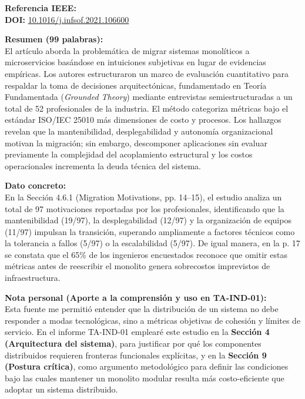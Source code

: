 \documentclass[11pt,a4paper]{article}
\begin{document}
\vspace{0.4cm}

\begin{tcolorbox}[colback=white,colframe=black!75!black,title=\textbf{Ficha Bibliográfica 3: Artículo Indexado (Information and Software Technology)}]
\textbf{Referencia IEEE:} \cite{ref3_towards_migration_framework} \\
\textbf{DOI:} \href{https://doi.org/10.1016/j.infsof.2021.106600}{10.1016/j.infsof.2021.106600}

\vspace{0.2cm}
\textbf{Resumen (99 palabras):} \\
El artículo aborda la problemática de migrar sistemas monolíticos a microservicios basándose en intuiciones subjetivas en lugar de evidencias empíricas. Los autores estructuraron un marco de evaluación cuantitativo para respaldar la toma de decisiones arquitectónicas, fundamentado en Teoría Fundamentada (\textit{Grounded Theory}) mediante entrevistas semiestructuradas a un total de 52 profesionales de la industria. El método categoriza métricas bajo el estándar ISO/IEC 25010 más dimensiones de costo y procesos. Los hallazgos revelan que la mantenibilidad, desplegabilidad y autonomía organizacional motivan la migración; sin embargo, descomponer aplicaciones sin evaluar previamente la complejidad del acoplamiento estructural y los costos operacionales incrementa la deuda técnica del sistema.

\vspace{0.2cm}
\textbf{Dato concreto:} \\
En la Sección 4.6.1 (Migration Motivations, pp. 14--15), el estudio analiza un total de 97 motivaciones reportadas por los profesionales, identificando que la mantenibilidad (19/97), la desplegabilidad (12/97) y la organización de equipos (11/97) impulsan la transición, superando ampliamente a factores técnicos como la tolerancia a fallos (5/97) o la escalabilidad (5/97). De igual manera, en la p. 17 se constata que el 65\% de los ingenieros encuestados reconoce que omitir estas métricas antes de reescribir el monolito genera sobrecostos imprevistos de infraestructura.

\vspace{0.2cm}
\textbf{Nota personal (Aporte a la comprensión y uso en TA-IND-01):} \\
Esta fuente me permitió entender que la distribución de un sistema no debe responder a modas tecnológicas, sino a métricas objetivas de cohesión y límites de servicio. En el informe TA-IND-01 emplearé este estudio en la \textbf{Sección 4 (Arquitectura del sistema)}, para justificar por qué los componentes distribuidos requieren fronteras funcionales explícitas, y en la \textbf{Sección 9 (Postura crítica)}, como argumento metodológico para definir las condiciones bajo las cuales mantener un monolito modular resulta más costo-eficiente que adoptar un sistema distribuido.
\end{tcolorbox}
\end{document}
